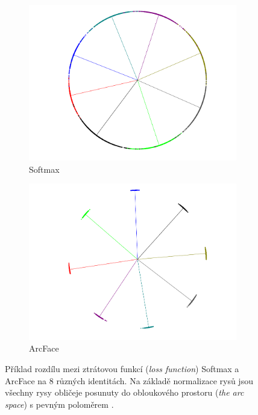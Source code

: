 \begin{figure}[H]
    \centering
    \begin{subfigure}{0.45\textwidth}
         \centering
         \includegraphics[width=1\textwidth]{obrazky-figures/softmaxnorm.pdf}
         \caption{Softmax}
         \label{fig:compactnesssoftmaxnorm}
     \end{subfigure}
     \hfill
     \begin{subfigure}{0.45\textwidth}
         \centering
         \includegraphics[width=1\textwidth]{obrazky-figures/arcfacenorm.pdf}
         \caption{ArcFace}
         \label{fig:compactnessarcfacenorm}
     \end{subfigure}
    \caption{Příklad rozdílu mezi ztrátovou funkcí (\textit{loss function}) Softmax a ArcFace na 8 různých identitách. Na základě normalizace rysů jsou všechny rysy obličeje posunuty do obloukového prostoru (\textit{the arc space}) s pevným poloměrem \cite{Deng_2022}.}
    \label{fig:compactness}
\end{figure}


